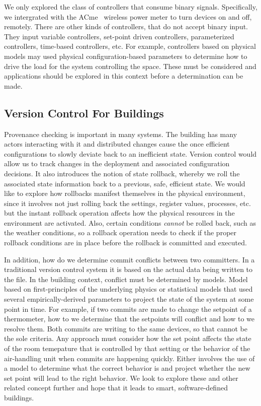 We only explored the class of controllers that consume binary signals.  Specifically, we intergrated with the ACme~\cite{acme}
wireless power meter to turn devices on and off, remotely.  There are other kinds of controllers, that do not accept binary input.
They input variable controllers, set-point driven controllers, parameterized controllers, time-based controllers, etc.  For example, 
controllers based on physical models may used physical configuration-based parameters to determine how to drive the 
load for the system controlling the space.  These must be considered and applications should be explored in this context
before a determination can be made.


\subsection{Version Control For Buildings}
Provenance checking is important in many systems.  The building has many actors interacting with it and distributed changes cause
the once efficient configurations to slowly deviate back to an inefficient state.  Version control would allow us to track changes
in the deployment and associated configuration decisions.  It also introduces the notion of state rollback, whereby we roll the associated state
information back to a previous, safe, efficient state.  We would like to explore how rollbacks manifest themselves in the 
physical environment, since it involves not just rolling back the settings, register values, processes, etc. but the instant 
rollback operation affects how the physical resources in the environment are activated.  Also, certain conditions \emph{cannot}
be rolled back, such as the weather conditions, so a rollback operation needs to check if the proper rollback conditions
are in place before the rollback is committed and executed.

In addition, how do we determine commit conflicts between two committers.  In a traditional version control system it is based on the actual
data being written to the file.  In the building context, conflict must be determined by models.  Model based on first-principles
of the underlying physics or statistical models that used several empirically-derived parameters to project the state of 
the system at some point in time.  For example, if two commits are made to change the setpoint of a thermometer, how to we determine
that the setpoints will conflict and how to we resolve them.  Both commits are writing to the same devices, so that cannot be the sole
criteria.  Any approach must consider how the set point affects the state of the room temepature that is controlled by that setting
or the behavior of the air-handling unit when commits are happening quickly.  Either involves the use of a model to determine
what the correct behavior is and project whether the new set point will lead to the right behavior.
We look to explore these and other related concept further and hope that it leads to smart, software-defined buildings.









